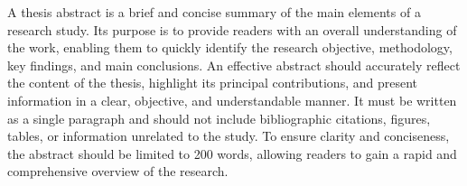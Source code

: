 A thesis abstract is a brief and concise summary of the main elements of a research study. Its purpose is to provide readers with an overall understanding of the work, enabling them to quickly identify the research objective, methodology, key findings, and main conclusions. An effective abstract should accurately reflect the content of the thesis, highlight its principal contributions, and present information in a clear, objective, and understandable manner. It must be written as a single paragraph and should not include bibliographic citations, figures, tables, or information unrelated to the study. To ensure clarity and conciseness, the abstract should be limited to 200 words, allowing readers to gain a rapid and comprehensive overview of the research.
